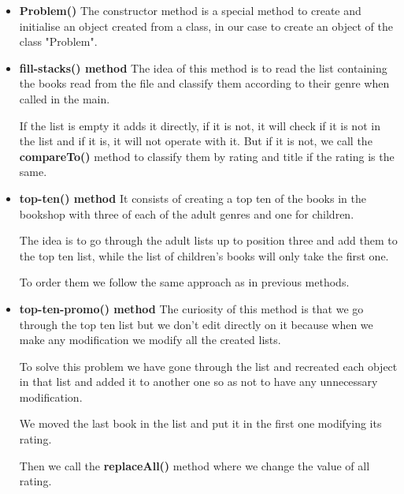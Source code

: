 \documentclass[a4paper]{article}
\theoremstyle{plain}
\theoremstyle{definition}
\begin{document}
	    \begin{itemize}
	        \item \textbf{Problem()}\newline
	         The constructor method is a special method to create and initialise an object created from a class, in our case to create an object of the class "Problem".
	        \item \textbf{fill-stacks() method} \newline
	          The idea of this method is to read the list containing the books read from the file and classify them according to their genre when called in the main.\newline

                If the list is empty it adds it directly, if it is not, it will check if it is not in the list and if it is, it will not operate with it. But if it is not, we call the \textbf{compareTo()} method to classify them by rating and title if the rating is the same.


	        \item \textbf{top-ten() method }\newline
	        It consists of creating a top ten of the books in the bookshop with three of each of the adult genres and one for children.\newline

            The idea is to go through the adult lists up to position three and add them to the top ten list, while the list of children's books will only take the first one.\newline

            To order them we follow the same approach as in previous methods.
	        \item \textbf{top-ten-promo() method }\newline
	        The curiosity of this method is that we go through the top ten list but we don't edit directly on it because when we make any modification we modify all the created lists.\newline

            To solve this problem we have gone through the list and recreated each object in that list and added it to another one so as not to have any unnecessary modification.\newline

            We moved the last book in the list and put it in the first one modifying its rating.\newline

            Then we call the \textbf{replaceAll()} method where we change the value of all rating.\newline


	        
	    \end{itemize}
	    
\end{document}
